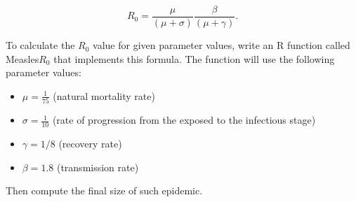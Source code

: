 \documentclass{article}
\begin{document}
\begin{equation*} R_0 = \frac{\mu}{(\mu + \sigma)} \frac{\beta}{(\mu + \gamma)}. \end{equation*}

To calculate the $R_0$ value for given parameter values,  write an R function 
called Measles$R_0$ that implements this formula. The function will use the following parameter values:

    \begin{itemize}
        \item $\mu = \frac{1}{75}$ (natural mortality rate)
        \item $\sigma = \frac{1}{10}$ (rate of progression from the exposed to the infectious stage)
        \item $\gamma = 1/8$ (recovery rate)
        \item $\beta = 1.8$ (transmission rate)
    \end{itemize}
Then compute the final size of such epidemic.
\end{document}
